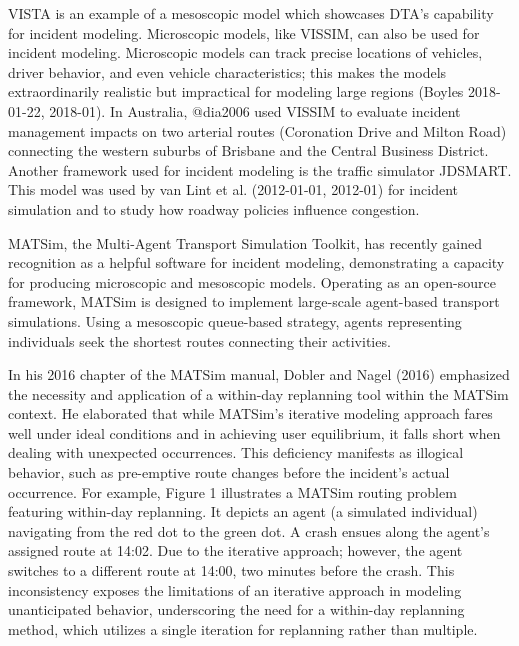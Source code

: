 \documentclass[
  letterpaper,
  DIV=11,
  numbers=noendperiod]{scrreprt}
\begin{document}
VISTA is an example of a mesoscopic model which showcases DTA's
capability for incident modeling. Microscopic models, like VISSIM, can
also be used for incident modeling. Microscopic models can track precise
locations of vehicles, driver behavior, and even vehicle
characteristics; this makes the models extraordinarily realistic but
impractical for modeling large regions (Boyles 2018-01-22, 2018-01). In
Australia, @dia2006 used VISSIM to evaluate incident management impacts
on two arterial routes (Coronation Drive and Milton Road) connecting the
western suburbs of Brisbane and the Central Business District. Another
framework used for incident modeling is the traffic simulator JDSMART.
This model was used by van Lint et al. (2012-01-01, 2012-01) for
incident simulation and to study how roadway policies influence
congestion.

MATSim, the Multi-Agent Transport Simulation Toolkit, has recently
gained recognition as a helpful software for incident modeling,
demonstrating a capacity for producing microscopic and mesoscopic
models. Operating as an open-source framework, MATSim is designed to
implement large-scale agent-based transport simulations. Using a
mesoscopic queue-based strategy, agents representing individuals seek
the shortest routes connecting their activities.

In his 2016 chapter of the MATSim manual, Dobler and Nagel (2016)
emphasized the necessity and application of a within-day replanning tool
within the MATSim context. He elaborated that while MATSim's iterative
modeling approach fares well under ideal conditions and in achieving
user equilibrium, it falls short when dealing with unexpected
occurrences. This deficiency manifests as illogical behavior, such as
pre-emptive route changes before the incident's actual occurrence. For
example, Figure 1 illustrates a MATSim routing problem featuring
within-day replanning. It depicts an agent (a simulated individual)
navigating from the red dot to the green dot. A crash ensues along the
agent's assigned route at 14:02. Due to the iterative approach; however,
the agent switches to a different route at 14:00, two minutes before the
crash. This inconsistency exposes the limitations of an iterative
approach in modeling unanticipated behavior, underscoring the need for a
within-day replanning method, which utilizes a single iteration for
replanning rather than multiple.
\end{document}

